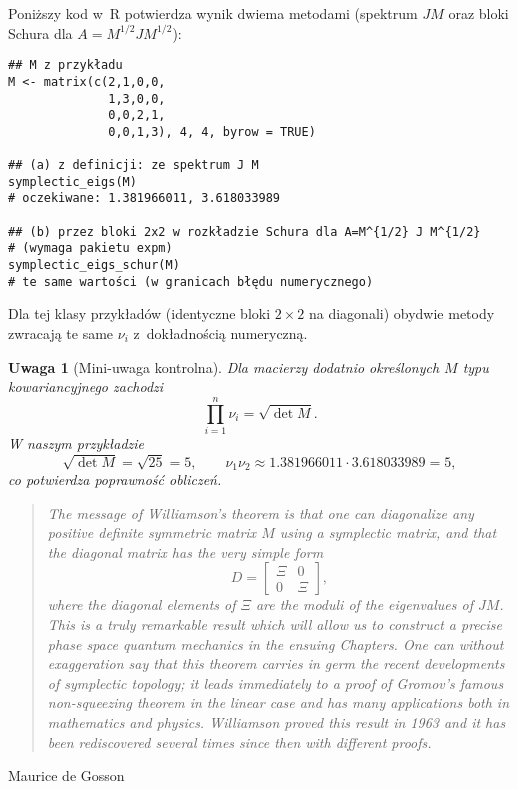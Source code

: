 \documentclass[12pt]{article}
\newtheorem{remark}{Uwaga}
\begin{document}
\noindent Poniższy kod w~R potwierdza wynik dwiema metodami (spektrum $JM$ oraz
bloki Schura dla $A=M^{1/2}JM^{1/2}$):

\begin{verbatim}
## M z przykładu
M <- matrix(c(2,1,0,0,
              1,3,0,0,
              0,0,2,1,
              0,0,1,3), 4, 4, byrow = TRUE)

## (a) z definicji: ze spektrum J M
symplectic_eigs(M)
# oczekiwane: 1.381966011, 3.618033989

## (b) przez bloki 2x2 w rozkładzie Schura dla A=M^{1/2} J M^{1/2}
# (wymaga pakietu expm)
symplectic_eigs_schur(M)
# te same wartości (w granicach błędu numerycznego)
\end{verbatim}

\noindent Dla tej klasy przykładów (identyczne bloki $2\times2$ na diagonali)
obydwie metody zwracają te same $\nu_i$ z~dokładnością numeryczną.

\begin{remark}[Mini-uwaga kontrolna]
Dla macierzy dodatnio określonych $M$ typu kowariancyjnego zachodzi
\[
\prod_{i=1}^n \nu_i = \sqrt{\det M}.
\]
W naszym przykładzie
\[
\sqrt{\det M} = \sqrt{25} = 5,
\qquad
\nu_1\nu_2 \approx 1.381966011 \cdot 3.618033989 = 5,
\]
co potwierdza poprawność obliczeń.
\end{remark}

\begin{quote}
\small
\emph{The message of Williamson’s theorem is that one can diagonalize any
positive definite symmetric matrix $M$ using a symplectic matrix, and that the
diagonal matrix has the very simple form
\[
D=\begin{bmatrix} \Xi & 0 \\ 0 & \Xi \end{bmatrix},
\]
where the diagonal elements of $\Xi$ are the moduli of the eigenvalues of $JM$.
This is a truly remarkable result which will allow us to construct a precise phase
space quantum mechanics in the ensuing Chapters. One can without exaggeration
say that this theorem carries in germ the recent developments of symplectic
topology; it leads immediately to a proof of Gromov’s famous non-squeezing
theorem in the linear case and has many applications both in mathematics and
physics. Williamson proved this result in 1963 and it has been rediscovered
several times since then with different proofs.}
\end{quote}

\begin{flushright}
Maurice de Gosson
\end{flushright}
\end{document}
